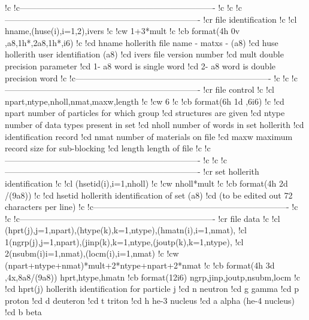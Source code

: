 \begin{ccode}
!c
!c----------------------------------------------------------------------
!c
!c
!c----------------------------------------------------------------------
!cr           file identification
!c
!cl    hname,(huse(i),i=1,2),ivers
!c
!cw    1+3*mult
!c
!cb    format(4h 0v ,a8,1h*,2a8,1h*,i6)
!c
!cd    hname         hollerith file name  - matxs -  (a8)
!cd    huse          hollerith user identifiation    (a8)
!cd    ivers         file version number
!cd    mult          double precision parameter
!cd                       1- a8 word is single word
!cd                       2- a8 word is double precision word
!c
!c----------------------------------------------------------------------
!c
!c
!c----------------------------------------------------------------------
!cr           file control
!c
!cl    npart,ntype,nholl,nmat,maxw,length
!c
!cw    6
!c
!cb    format(6h 1d   ,6i6)
!c
!cd    npart       number of particles for which group
!cd                   structures are given
!cd    ntype       number of data types present in set
!cd    nholl       number of words in set hollerith
!cd                    identification record
!cd    nmat        number of materials on file
!cd    maxw        maximum record size for sub-blocking
!cd    length      length of file
!c
!c----------------------------------------------------------------------
!c
!c
!c----------------------------------------------------------------------
!cr           set hollerith identification
!c
!cl    (hsetid(i),i=1,nholl)
!c
!cw    nholl*mult
!c
!cb    format(4h 2d /(9a8))
!c
!cd    hsetid      hollerith identification of set (a8)
!cd                 (to be edited out 72 characters per line)
!c
!c----------------------------------------------------------------------
!c
!c
!c----------------------------------------------------------------------
!cr          file data
!c
!cl    (hprt(j),j=1,npart),(htype(k),k=1,ntype),(hmatn(i),i=1,nmat),
!cl   1(ngrp(j),j=1,npart),(jinp(k),k=1,ntype,(joutp(k),k=1,ntype),
!cl   2(nsubm(i)i=1,nmat),(locm(i),i=1,nmat)
!c
!cw    (npart+ntype+nmat)*mult+2*ntype+npart+2*nmat
!c
!cb    format(4h 3d ,4x,8a8/(9a8))    hprt,htype,hmatn
!cb    format(12i6)                  ngrp,jinp,joutp,nsubm,locm
!c
!cd    hprt(j)     hollerith identification for particle j
!cd                     n         neutron
!cd                     g         gamma
!cd                     p         proton
!cd                     d         deuteron
!cd                     t         triton
!cd                     h         he-3 nucleus
!cd                     a         alpha (he-4 nucleus)
!cd                     b         beta

\end{ccode}
